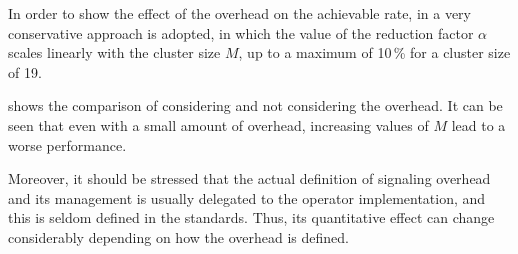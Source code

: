 In order to show the effect of the overhead on the achievable rate, in
 a very conservative approach is adopted, in which the value of the reduction factor $\alpha$ scales linearly with the cluster size
$M$, up to a maximum of 10\,\% for a cluster size of 19.

 shows the comparison of considering and not
considering the overhead. It can be seen that even with a small amount of
overhead, increasing values of $M$ lead to a worse performance.

Moreover, it should be stressed that the actual definition of signaling
overhead and its management is usually delegated to the operator implementation,
and this is seldom defined in the standards. Thus, its quantitative effect can
change considerably depending on how the overhead is defined.




